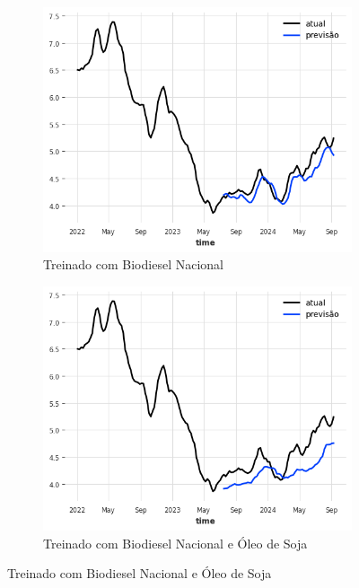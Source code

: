 \begin{figure}[htbp]
	\centering
	\begin{subfigure}[b]{0.45\textwidth}
		\centering
		\includegraphics[width=\textwidth]{figuras/mlp_brasil_plot.png} %
		\caption{Treinado com Biodiesel Nacional \newline}
		\label{fig:mlp_brasil_plot}
	\end{subfigure}
	\hfill
	\begin{subfigure}[b]{0.45\textwidth}
		\centering
		\includegraphics[width=\textwidth]{figuras/mlp_brasil_oil_plot.png} %
		\caption{Treinado com Biodiesel Nacional e Óleo de Soja}
		\label{fig:mlp_brasil_oil_plot}
	\end{subfigure}


\end{figure}
